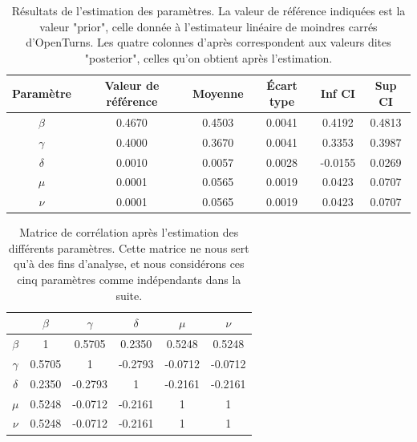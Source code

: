 \documentclass[
  french,
	10pt, %
]{fphw}
\newcommand{\tabhead}[1]{{\bfseries#1}}
\begin{document}
\begin{table}[h!]
  \centering
  \begin{tabular}{c c c c c c}
      \toprule
      \tabhead{Paramètre} & \tabhead{Valeur de référence} & \tabhead{Moyenne} & \tabhead{Écart type} & \tabhead{Inf CI} & \tabhead{Sup CI} \\
      \midrule
      \tabhead{$\beta$} & 0.4670 & 0.4503 & 0.0041 & 0.4192 & 0.4813 \\
      \tabhead{$\gamma$} & 0.4000 & 0.3670 & 0.0041 & 0.3353 & 0.3987 \\
      \tabhead{$\delta$} & 0.0010 & 0.0057 & 0.0028 & -0.0155 & 0.0269 \\
      \tabhead{$\mu$} & 0.0001 & 0.0565 & 0.0019 & 0.0423 & 0.0707 \\
      \tabhead{$\nu$} & 0.0001 & 0.0565 & 0.0019 & 0.0423 & 0.0707 \\
      \bottomrule
  \end{tabular}
  \caption{Résultats de l'estimation des paramètres. La valeur de référence indiquées est la valeur "prior", celle donnée à l'estimateur linéaire de moindres carrés d'OpenTurns. Les quatre colonnes d'après correspondent aux valeurs dites "posterior", celles qu'on obtient après l'estimation.}
  \label{tab:params}
\end{table}

\begin{table}[h!]
  \centering
  \begin{tabular}{c| c c c c c}
      \toprule
      & \tabhead{$\beta$} & \tabhead{$\gamma$} & \tabhead{$\delta$} & \tabhead{$\mu$} & \tabhead{$\nu$} \\
      \midrule
      \tabhead{$\beta$} & 1 & 0.5705 & 0.2350 & 0.5248 & 0.5248 \\
      \tabhead{$\gamma$} & 0.5705 & 1 & -0.2793 & -0.0712 & -0.0712 \\
      \tabhead{$\delta$} & 0.2350 & -0.2793 & 1 & -0.2161 & -0.2161 \\
      \tabhead{$\mu$} & 0.5248 & -0.0712 & -0.2161 & 1 & 1 \\
      \tabhead{$\nu$} & 0.5248 & -0.0712 & -0.2161 & 1 & 1 \\
      \bottomrule
  \end{tabular}
  \caption{Matrice de corrélation après l'estimation des différents paramètres. Cette matrice ne nous sert qu'à des fins d'analyse, et nous considérons ces cinq paramètres comme indépendants dans la suite.}
  \label{tab:cor}
\end{table}
\end{document}
